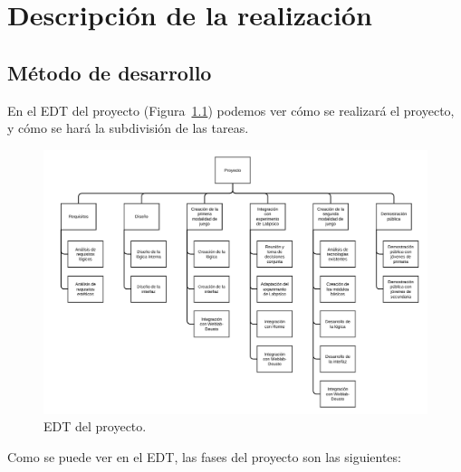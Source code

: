\chapter{Descripción de la realización}

\section{Método de desarrollo}

En el EDT del proyecto (Figura~\ref{fig:edt}) podemos ver cómo se realizará el proyecto, y cómo se
hará la subdivisión de las tareas.

\begin{figure}
	\centering
	\includegraphics[height=\textwidth, angle=-90]{fig/edt}
	\caption{EDT del proyecto.}\label{fig:edt}
\end{figure}

Como se puede ver en el EDT, las fases del proyecto son las siguientes:

